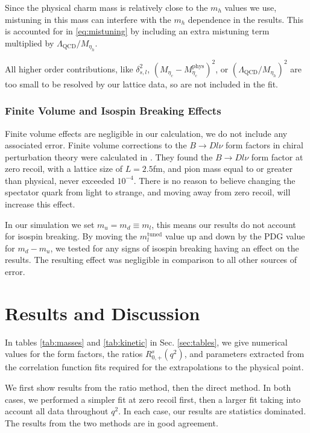 Since the physical charm mass is relatively close to the $m_h$ values we use, mistuning in this mass can interfere with the $m_h$ dependence in the results. This is accounted for in \eqref{eq:mistuning} by including an extra mistuning term multiplied by $\Lambda_{\text{QCD}}/ M_{\eta_h}$.

All higher order contributions, like $\delta_{s,l}^2$, $(M_{\eta_c}-M_{\eta_c}^{\text{phys}})^2$, or $(\Lambda_{\text{QCD}}/ M_{\eta_h})^2$ are too small to be resolved by our lattice data, so are not included in the fit.

\subsubsection{Finite Volume and Isospin Breaking Effects}

Finite volume effects are negligible in our calculation, we do not include any associated error. Finite volume corrections to the $B\to Dl\nu$ form factors in chiral perturbation theory were calculated in \cite{Laiho:2005ue}. They found the $B\to Dl\nu$ form factor at zero recoil, with a lattice size of $L=2.5$fm, and pion mass equal to or greater than physical, never exceeded $10^{-4}$. There is no reason to believe changing the spectator quark from light to strange, and moving away from zero recoil, will increase this effect.

In our simulation we set $m_u=m_d\equiv m_l$, this means our results do not account for isospin breaking. By moving the $m_l^{\text{tuned}}$ value up and down by the PDG value for $m_d-m_u$, we tested for any signs of isospin breaking having an effect on the results. The resulting effect was negligible in comparison to all other sources of error.

\section{Results and Discussion}
\label{sec:results}

In tables \ref{tab:masses} and \ref{tab:kinetic} in Sec. \ref{sec:tables}, we give numerical values for the form factors, the ratios $R_{0,+}^s(q^2)$, and parameters extracted from the correlation function fits required for the extrapolations to the physical point.

We first show results from the ratio method, then the direct method. In both cases, we performed a simpler fit at zero recoil first, then a larger fit taking into account all data throughout $q^2$.  In each case, our results are statistics dominated. The results from the two methods are in good agreement.

